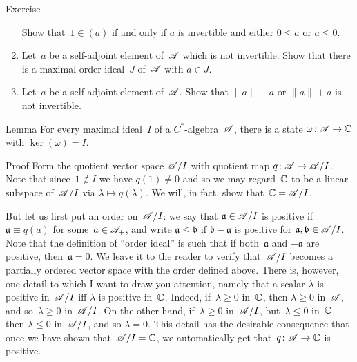 \documentclass[a]{subfiles}
\begin{document}
\begin{parsec}
\begin{point}{Exercise}
\begin{enumerate}
Show that~$1\in (a)$ if and only if $a$ is invertible
and either $0\leq a$ or $a\leq 0$.

\item
Let~$a$ be a self-adjoint element of~$\mathscr{A}$ which
is not invertible.
Show that there is a maximal order ideal~$J$
of~$\mathscr{A}$
with $a\in J$.

\item
Let~$a$ be a self-adjoint element of~$\mathscr{A}$.
Show that  $\|a\|-a$
or $\|a\|+a$ is not invertible.
\end{enumerate}
\end{point}
\begin{point}{Lemma}%
For every maximal ideal~$I$ of a $C^*$-algebra~$\mathscr{A}$,
 there is a state $\omega \colon \mathscr{A}\to \mathbb{C}$
with $\ker(\omega)=I$.
\begin{point}{Proof}%
Form the quotient vector space $\mathscr{A}/I$
with quotient map $q\colon \mathscr{A}\to \mathscr{A}/I$.
Note that since~$1\notin I$
we have $q(1)\neq 0$
and so we may regard~$\mathbb{C}$ 
to be a linear subspace of~$\mathscr{A}/I$
via $\lambda\mapsto q(\lambda)$.
We will, in fact, show that~$\mathbb{C}=\mathscr{A}/I$.

But let us first put an order on~$\mathscr{A}/I$:
we say that $\mathfrak{a}\in \mathscr{A}/I$ is positive
if $\mathfrak{a}\equiv q(a)$ for some~$a\in\mathscr{A}_{+}$,
and write $\mathfrak{a}\leq \mathfrak{b}$ 
if $\mathfrak{b}-\mathfrak{a}$ is positive
for $\mathfrak{a},\mathfrak{b}\in\mathscr{A}/I$.
Note that the definition of ``order ideal'' is such
that if both~$\mathfrak{a}$ and $-\mathfrak{a}$ are positive,
then~$\mathfrak{a}=0$.
We leave it to the reader to verify 
that~$\mathscr{A}/I$ becomes a partially ordered vector space
with the order defined above.
There is, however,
one detail to which I want to draw you attention,
namely that a scalar $\lambda$ is positive in~$\mathscr{A}/I$
iff $\lambda$ is positive in~$\mathbb{C}$.
Indeed, if~$\lambda\geq 0$ in~$\mathbb{C}$,
then $\lambda\geq 0$ in~$\mathscr{A}$, and so~$\lambda \geq 0$ in~$\mathscr{A}/I$.
On the other hand,
if~$\lambda\geq 0$ in~$\mathscr{A}/I$, but~$\lambda\leq 0$ in~$\mathbb{C}$,
then $\lambda\leq 0$ in~$\mathscr{A}/I$,
and so $\lambda=0$.
This detail
has the desirable consequence
that once we have shown that~$\mathscr{A}/I=\mathbb{C}$,
we automatically get that~$q\colon \mathscr{A}\to\mathbb{C}$ is positive.


\end{point}
\end{point}
\end{parsec}
\end{document}
